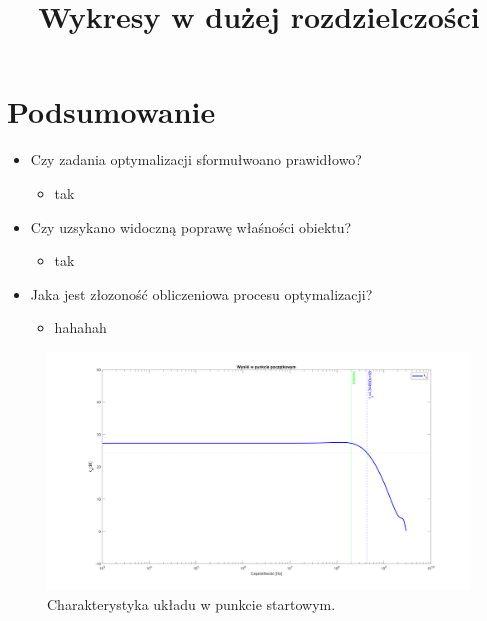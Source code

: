\documentclass{article}
\begin{document}
\section{Podsumowanie}
\begin{itemize}
	\item Czy zadania optymalizacji sformułwoano prawidłowo?
	      \begin{itemize}
		      \item tak
	      \end{itemize}
	\item Czy uzsykano widoczną poprawę właśności obiektu?
	      \begin{itemize}
		      \item tak
	      \end{itemize}

	\item Jaka jest złozoność obliczeniowa procesu optymalizacji?
	      \begin{itemize}
		      \item hahahah
	      \end{itemize}

\end{itemize}


\pagebreak
\begin{center}
	\title{ \huge \textbf{Wykresy w dużej rozdzielczości}}
\end{center}

\begin{landscape}
	\begin{figure}[h]
		\vspace*{-2cm}
		\includegraphics[width=25cm,height=15 cm]{graphics/starting_point.png}
		\centering
		\caption{Charakterystyka układu w punkcie startowym.}
	\end{figure}
\end{landscape}
\end{document}
